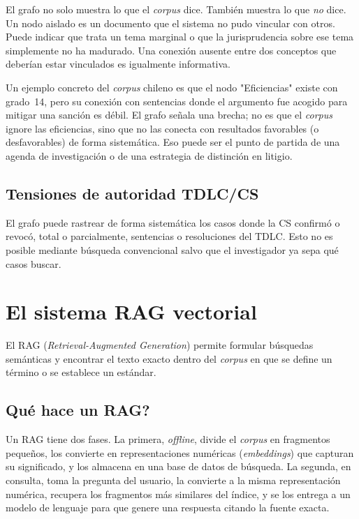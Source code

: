 \documentclass[12pt,a4paper]{article}
\begin{document}
El grafo no solo muestra lo que el \textit{corpus} dice. También muestra lo que
\emph{no} dice. Un nodo aislado es un
documento que el sistema no pudo vincular con otros. Puede indicar que trata un
tema marginal o que la jurisprudencia sobre ese tema simplemente no ha madurado. Una
conexión ausente entre dos conceptos que deberían estar vinculados es igualmente
informativa.

Un ejemplo concreto del \textit{corpus} chileno es que el nodo "Eficiencias" existe con
grado~14, pero su conexión con sentencias donde el argumento fue acogido para
mitigar una sanción es débil. El grafo señala una brecha; no es que el
\textit{corpus} ignore las eficiencias, sino que no las conecta con resultados
favorables (o desfavorables) de forma sistemática. Eso puede ser el punto de partida de una agenda
de investigación o de una estrategia de distinción en litigio.

\subsection{Tensiones de autoridad TDLC/CS}

El grafo puede rastrear de forma sistemática los casos donde la CS confirmó o
revocó, total o parcialmente, sentencias o resoluciones del TDLC. Esto no es
posible mediante búsqueda convencional salvo que el investigador ya sepa qué
casos buscar.

\section{El sistema RAG vectorial}
\label{sec:rag}

El RAG (\emph{Retrieval-Augmented Generation}) permite formular búsquedas semánticas y 
encontrar el texto exacto dentro del \textit{corpus} en que se define un término
o se establece un estándar.

\subsection{\textquestiondown Qué hace un RAG?}

Un RAG tiene dos fases. La primera, \textit{offline}, divide el \textit{corpus} en fragmentos
pequeños, los convierte en representaciones numéricas (\emph{embeddings}) que
capturan su significado, y los almacena en una base de datos de búsqueda. La
segunda, en consulta, toma la pregunta del usuario, la convierte a la misma
representación numérica, recupera los fragmentos más similares del índice, y se
los entrega a un modelo de lenguaje para que genere una respuesta citando la
fuente exacta.
\end{document}
